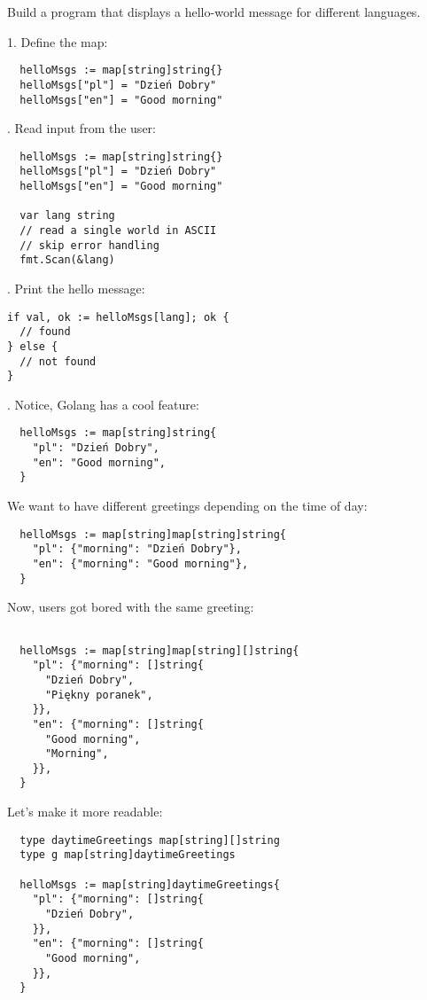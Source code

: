 \documentclass[11pt, letterpaper]{article}
\begin{document}
Build a program that displays a hello-world message for different languages.

1. Define the map:

\begin{verbatim}
  helloMsgs := map[string]string{}
  helloMsgs["pl"] = "Dzień Dobry"
  helloMsgs["en"] = "Good morning"
\end{verbatim}

. Read input from the user:

\begin{verbatim}
  helloMsgs := map[string]string{}
  helloMsgs["pl"] = "Dzień Dobry"
  helloMsgs["en"] = "Good morning"

  var lang string
  // read a single world in ASCII
  // skip error handling
  fmt.Scan(&lang)
\end{verbatim}

. Print the hello message:

\begin{verbatim}
if val, ok := helloMsgs[lang]; ok {
  // found
} else {
  // not found
}
\end{verbatim}

. Notice, Golang has a cool feature:

\begin{verbatim}
  helloMsgs := map[string]string{
    "pl": "Dzień Dobry",
    "en": "Good morning",
  }
\end{verbatim}

We want to have different greetings depending on the time of day:

\begin{verbatim}
  helloMsgs := map[string]map[string]string{
    "pl": {"morning": "Dzień Dobry"},
    "en": {"morning": "Good morning"},
  }
\end{verbatim}

Now, users got bored with the same greeting:

\begin{verbatim}

  helloMsgs := map[string]map[string][]string{
    "pl": {"morning": []string{
      "Dzień Dobry",
      "Piękny poranek",
    }},
    "en": {"morning": []string{
      "Good morning",
      "Morning",
    }},
  }
\end{verbatim}

Let's make it more readable:

\begin{verbatim}
  type daytimeGreetings map[string][]string
  type g map[string]daytimeGreetings

  helloMsgs := map[string]daytimeGreetings{
    "pl": {"morning": []string{
      "Dzień Dobry",
    }},
    "en": {"morning": []string{
      "Good morning",
    }},
  }
\end{verbatim}
\end{document}
